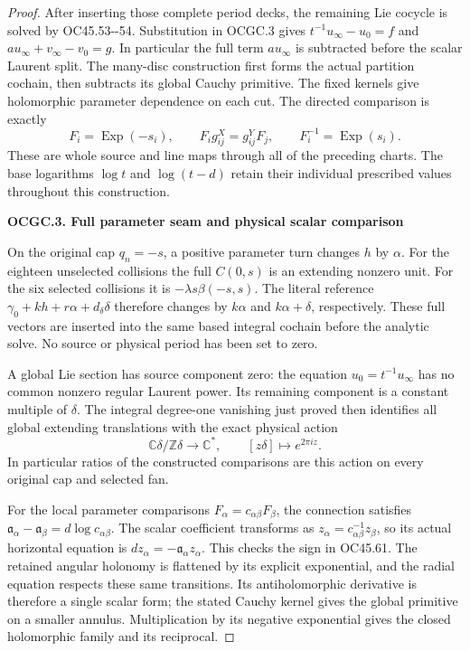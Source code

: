 \begin{proof}
After inserting those complete period decks, the remaining Lie
cocycle is solved by OC45.53-\/-54. Substitution in OCGC.3 gives
\(t^{-1}u_\infty-u_0=f\) and
\(a u_\infty+v_\infty-v_0=g\). In particular the full term
\(a u_\infty\) is subtracted before the scalar Laurent split.
The many-disc construction first forms the actual partition cochain,
then subtracts its global Cauchy primitive. The fixed kernels give
holomorphic parameter dependence on each cut. The directed comparison
is exactly
\[
F_i=\operatorname{Exp}(-s_i),\qquad
F_i g^X_{ij}=g^Y_{ij}F_j,\qquad F_i^{-1}=\operatorname{Exp}(s_i).
\tag{OCGC.4}
\]
These are whole source and line maps through all of the preceding
charts. The base logarithms \(\log t\) and \(\log(t-d)\) retain their
individual prescribed values throughout this construction.

\par

\medskip\noindent\textbf{OCGC.3. Full parameter seam and physical scalar comparison}

\par\nobreak

On the original cap \(q_n=-s\), a positive parameter turn changes
\(h\) by \(\alpha\). For the eighteen unselected collisions the full
\(C(0,s)\) is an extending nonzero unit. For the six selected
collisions it is \(-\lambda s\beta(-s,s)\). The literal reference
\(\gamma_0+k h+r\alpha+d_\delta\delta\) therefore changes by
\(k\alpha\) and \(k\alpha+\delta\), respectively. These full vectors
are inserted into the same based integral cochain before the analytic
solve. No source or physical period has been set to zero.

A global Lie section has source component zero: the equation
\(u_0=t^{-1}u_\infty\) has no common nonzero regular Laurent power.
Its remaining component is a constant multiple of \(\delta\).
The integral degree-one vanishing just proved then identifies all
global extending translations with the exact physical action
\[
\mathbb C\delta/\mathbb Z\delta\longrightarrow\mathbb C^*,
\qquad [z\delta]\longmapsto e^{2\pi i z}.
\tag{OCGC.5}
\]
In particular ratios of the constructed comparisons are this action
on every original cap and selected fan.

For the local parameter comparisons \(F_\alpha=c_{\alpha\beta}F_\beta\),
the connection satisfies
\(\mathfrak a_\alpha-\mathfrak a_\beta=d\log c_{\alpha\beta}\).
The scalar coefficient transforms as
\(z_\alpha=c_{\alpha\beta}^{-1}z_\beta\), so its actual horizontal
equation is \(dz_\alpha=-\mathfrak a_\alpha z_\alpha\). This checks
the sign in OC45.61. The retained angular holonomy is flattened by
its explicit exponential, and the radial equation respects these
same transitions. Its antiholomorphic derivative is therefore a
single scalar form; the stated Cauchy kernel gives the global
primitive on a smaller annulus. Multiplication by its negative
exponential gives the closed holomorphic family and its reciprocal.


\end{proof}
